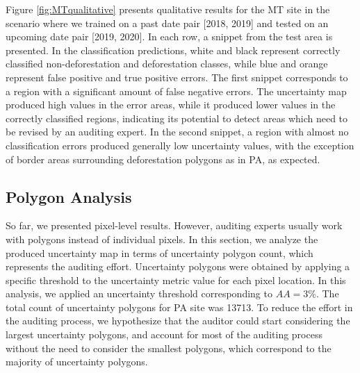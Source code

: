 Figure \ref{fig:MTqualitative} presents qualitative results for the MT site in the scenario where we trained on a past date pair [2018, 2019] and tested on an upcoming date pair [2019, 2020]. In each row, a snippet from the test area is presented. In the classification predictions, white and black represent correctly classified non-deforestation and deforestation classes, while blue and orange represent false positive and true positive errors. The first snippet corresponds to a region with a significant amount of false negative errors. The uncertainty map produced high values in the error areas, while it produced lower values in the correctly classified regions, indicating its potential to detect areas which need to be revised by an auditing expert. In the second snippet, a region with almost no classification errors produced generally low uncertainty values, with the exception of border areas surrounding deforestation polygons as in PA, as expected.



\subsection{Polygon Analysis}\label{sec:results_polygon}

So far, we presented pixel-level results. However, auditing experts usually work with polygons instead of individual pixels. In this section, we analyze the produced uncertainty map in terms of uncertainty polygon count, which represents the auditing effort. Uncertainty polygons were obtained by applying a specific threshold to the uncertainty metric value for each pixel location. In this analysis, we applied an uncertainty threshold corresponding to $AA=3\%$. The total count of uncertainty polygons for PA site was 13713. To reduce the effort in the auditing process, we hypothesize that the auditor could start considering the largest uncertainty polygons, and account for most of the auditing process without the need to consider the smallest polygons, which correspond to the majority of uncertainty polygons. 

